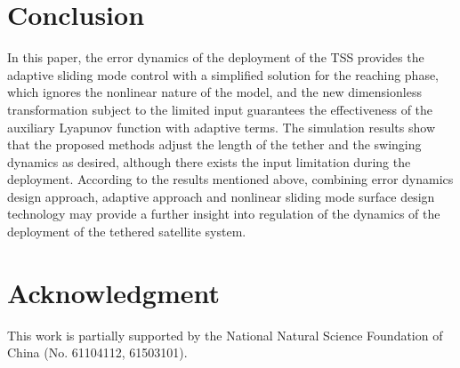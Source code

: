 \documentclass[Journal,letterpaper]{ascelike-new}
\theoremstyle{plain}
\theoremstyle{remark}
\begin{document}
\section{Conclusion}\label{sec:5}
In this paper, the error dynamics of the deployment of the TSS provides the adaptive sliding mode control with a simplified solution for the reaching phase, which ignores the nonlinear nature of the model, and the new dimensionless transformation subject to the limited input guarantees the effectiveness of the auxiliary Lyapunov function with adaptive terms. The simulation results show that the proposed methods adjust the length of the tether and the swinging dynamics as desired, although there exists the input limitation during the deployment. According to the results mentioned above, combining error dynamics design approach, adaptive approach and nonlinear sliding mode surface design technology may provide a further insight into regulation of the dynamics of the deployment of the tethered satellite system.
\section{Acknowledgment}
This work is partially supported by the National Natural Science Foundation of China (No. 61104112, 61503101).
%
%
%

%
\end{document}
